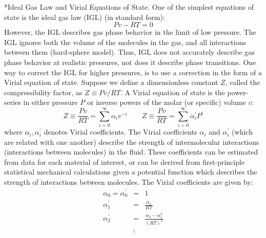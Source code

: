 \documentclass[11pt]{article}
\makeatletter
\theoremstyle{definition}
\renewcommand\subsubsection{\@startsection
	{subsubsection}{2}{0mm}
	{-0.05in}
	{-0.5\baselineskip}
	{\normalfont\normalsize\bfseries}}
\makeatother
\begin{document}
\subsubsection*{Ideal Gas Law and Virial Equations of State.}
One of the simplest equations of state is the ideal gas law (IGL) (in standard form):
\begin{equation}
  Pv-RT = 0
\end{equation}
However, the IGL describes gas phase behavior in the limit of low pressure.
The IGL ignores both the volume of the molecules in the gas, and all interactions between them (hard-sphere model).
Thus, IGL does not accurately describe gas phase behavior at realistic pressures, not does it describe phase transitions.
One way to correct the IGL for higher pressures, is to use a correction in the form of a Virial equation of state.
Suppose we define a dimensionless constant $Z$, called the compressibility factor, as $Z \equiv {Pv}/{RT}$.
A Virial equation of state is the power-series in either pressure $P$ or
inverse powers of the molar (or specific) volume $v$:
\begin{equation}
  \displaystyle Z \equiv \frac{Pv}{RT} = \sum_{i=0}^{\infty}\alpha_{i}v^{-i}\qquad
  \displaystyle Z \equiv \frac{Pv}{RT} = \sum_{i=0}^{\infty}\alpha^{\prime}_{i}P^{i}
\end{equation}
where $\alpha_{i},\alpha^{\prime}_{i}$ denotes Virial coefficients.
The Virial coefficients $\alpha_{i}$ and $\alpha^{\prime}_{i}$ (which are related with one another)
describe the strength of intermolecular interactions (interactions between molecules) in the fluid.
These coefficients can be estimated from data for each material of interest, or can be derived
from first-principle statistical mechanical calculations given a potential function which describes the strength of interactions between molecules.
The Virial coefficients are given by:
\begin{eqnarray*}\nonumber
	\alpha_{0}=\alpha^{\prime}_{0} &=& 1 \\
	\alpha_{1}^{\prime} &=& \frac{\alpha_{1}}{RT}\\\nonumber
  \alpha_{2}^{\prime} &=& \frac{\alpha_{2}-\alpha_{1}^2}{\left(RT\right)^2}\\\nonumber
  & \vdots &
\end{eqnarray*}

\clearpage
\end{document}

